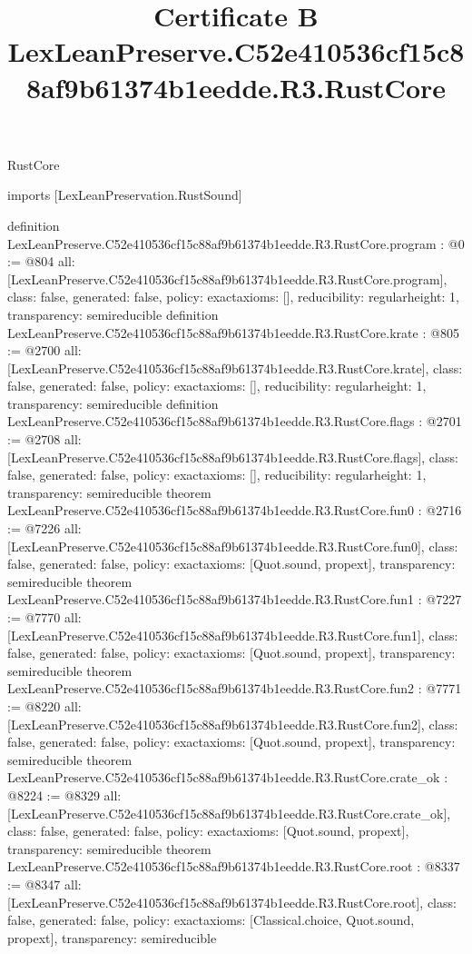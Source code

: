 \begin{lexlean}{RustCore}
\title{Certificate B LexLeanPreserve.C52e410536cf15c88af9b61374b1eedde.R3.RustCore}
\begin{coremodule}
imports [LexLeanPreservation.RustSound]

definition LexLeanPreserve.C52e410536cf15c88af9b61374b1eedde.R3.RustCore.program : @0 := @804 {
  all: [LexLeanPreserve.C52e410536cf15c88af9b61374b1eedde.R3.RustCore.program],
  class: false,
  generated: false,
  policy: exact{axioms: []},
  reducibility: regular{height: 1},
  transparency: semireducible
}
definition LexLeanPreserve.C52e410536cf15c88af9b61374b1eedde.R3.RustCore.krate : @805 := @2700 {
  all: [LexLeanPreserve.C52e410536cf15c88af9b61374b1eedde.R3.RustCore.krate],
  class: false,
  generated: false,
  policy: exact{axioms: []},
  reducibility: regular{height: 1},
  transparency: semireducible
}
definition LexLeanPreserve.C52e410536cf15c88af9b61374b1eedde.R3.RustCore.flags : @2701 := @2708 {
  all: [LexLeanPreserve.C52e410536cf15c88af9b61374b1eedde.R3.RustCore.flags],
  class: false,
  generated: false,
  policy: exact{axioms: []},
  reducibility: regular{height: 1},
  transparency: semireducible
}
theorem LexLeanPreserve.C52e410536cf15c88af9b61374b1eedde.R3.RustCore.fun0 : @2716 := @7226 {
  all: [LexLeanPreserve.C52e410536cf15c88af9b61374b1eedde.R3.RustCore.fun0],
  class: false,
  generated: false,
  policy: exact{axioms: [Quot.sound, propext]},
  transparency: semireducible
}
theorem LexLeanPreserve.C52e410536cf15c88af9b61374b1eedde.R3.RustCore.fun1 : @7227 := @7770 {
  all: [LexLeanPreserve.C52e410536cf15c88af9b61374b1eedde.R3.RustCore.fun1],
  class: false,
  generated: false,
  policy: exact{axioms: [Quot.sound, propext]},
  transparency: semireducible
}
theorem LexLeanPreserve.C52e410536cf15c88af9b61374b1eedde.R3.RustCore.fun2 : @7771 := @8220 {
  all: [LexLeanPreserve.C52e410536cf15c88af9b61374b1eedde.R3.RustCore.fun2],
  class: false,
  generated: false,
  policy: exact{axioms: [Quot.sound, propext]},
  transparency: semireducible
}
theorem LexLeanPreserve.C52e410536cf15c88af9b61374b1eedde.R3.RustCore.crate_ok : @8224 := @8329 {
  all: [LexLeanPreserve.C52e410536cf15c88af9b61374b1eedde.R3.RustCore.crate_ok],
  class: false,
  generated: false,
  policy: exact{axioms: [Quot.sound, propext]},
  transparency: semireducible
}
theorem LexLeanPreserve.C52e410536cf15c88af9b61374b1eedde.R3.RustCore.root : @8337 := @8347 {
  all: [LexLeanPreserve.C52e410536cf15c88af9b61374b1eedde.R3.RustCore.root],
  class: false,
  generated: false,
  policy: exact{axioms: [Classical.choice, Quot.sound, propext]},
  transparency: semireducible
}


\end{coremodule}
\end{lexlean}
